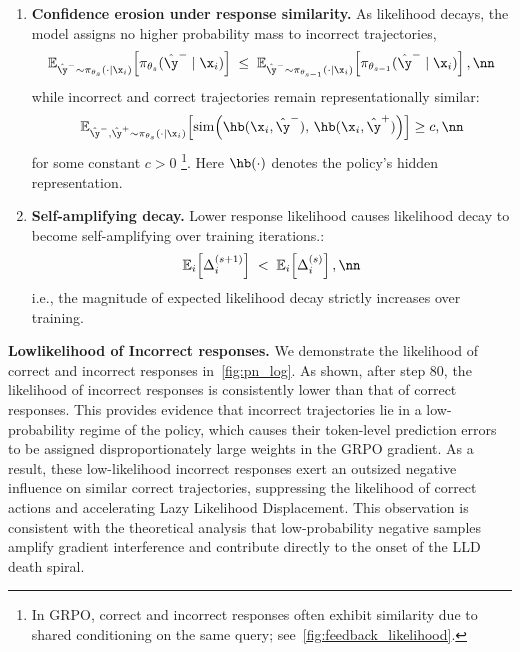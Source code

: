 \begin{definition}
\begin{enumerate}
    \item \textbf{Confidence erosion under response similarity.}
    As likelihood decays, the model assigns no higher probability mass to incorrect trajectories,
    \begin{equation}
    \mathbb{E}_{\hat{\y}^- \sim \pi_{\theta_s}(\cdot \mid \x_i)} 
    \!\left[\pi_{\theta_s}(\hat{\y}^- \mid \x_i)\right]
    \;\le\;
    \mathbb{E}_{\hat{\y}^- \sim \pi_{\theta_{s-1}}(\cdot \mid \x_i)} 
    \!\left[\pi_{\theta_{s-1}}(\hat{\y}^- \mid \x_i)\right],
    \nn
    \end{equation}
    while incorrect and correct trajectories remain representationally similar:
    \begin{equation}
    \mathbb{E}_{\hat{\y}^-,\hat{\y}^+ \sim \pi_{\theta_s}(\cdot \mid \x_i)}
    \!\left[
    \mathrm{sim}\!\left(\hb(\x_i,\hat{\y}^-),\,\hb(\x_i,\hat{\y}^+)\right)
    \right]
    \ge c ,
    \nn
    \end{equation}
    for some constant $c>0$
    \footnote{In GRPO, correct and incorrect responses often exhibit similarity due to shared conditioning on the same query; see~\cref{fig:feedback_likelihood}.}.
    Here $\hb(\cdot)$ denotes the policy’s hidden representation.

    \item \textbf{Self-amplifying decay.}
    Lower response likelihood causes likelihood decay to become self-amplifying over training iterations.:
    \begin{equation}
    \mathbb{E}_{i}\!\left[\Delta^{(s+1)}_i\right]
    \;<\;
    \mathbb{E}_{i}\!\left[\Delta^{(s)}_i\right],
    \nn
    \end{equation}
    i.e., the magnitude of expected likelihood decay strictly increases over training.
\end{enumerate}
\end{definition}

\textbf{Lowlikelihood of Incorrect responses.} We demonstrate the likelihood of correct and incorrect responses in~\cref{fig:pn_log}. As shown, after step 80, the likelihood of incorrect responses is consistently lower than that of correct responses. This provides evidence that incorrect trajectories lie in a low-probability regime of the policy, which causes their token-level prediction errors to be assigned disproportionately large weights in the GRPO gradient. As a result, these low-likelihood incorrect responses exert an outsized negative influence on similar correct trajectories, suppressing the likelihood of correct actions and accelerating Lazy Likelihood Displacement. This observation is consistent with the theoretical analysis that low-probability negative samples amplify gradient interference and contribute directly to the onset of the LLD death spiral.
